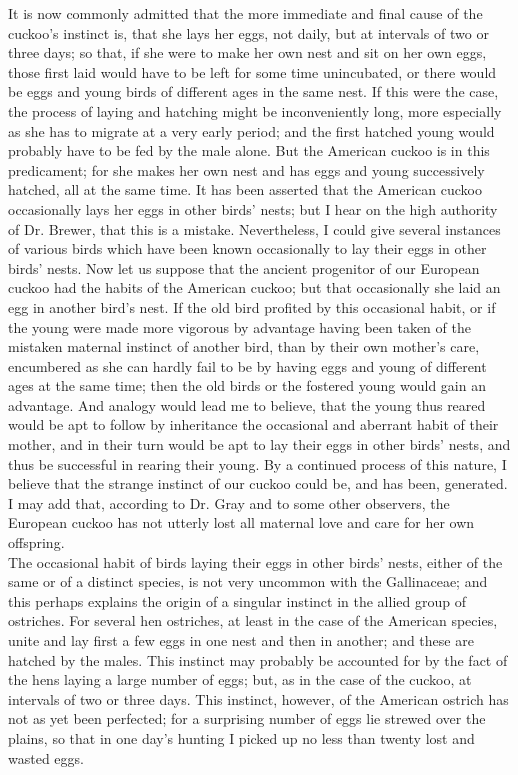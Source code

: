 \indent It is now commonly admitted that the more immediate and final cause of the cuckoo's instinct is, that she lays her eggs, not daily, but at intervals of two or three days; so that, if she were to make her own nest and sit on her own eggs, those first laid would have to be left for some time unincubated, or there would be eggs and young birds of different ages in the same nest. If this were the case, the process of laying and hatching might be inconveniently long, more especially as she has to migrate at a very early period; and the first hatched young would probably have to be fed by the male alone. But the American cuckoo is in this predicament; for she makes her own nest and has eggs and young successively hatched, all at the same time. It has been asserted that the American cuckoo occasionally lays her eggs in other birds' nests; but I hear on the high authority of Dr. Brewer, that this is a mistake. Nevertheless, I could give several instances of various birds which have been known occasionally to lay their eggs in other birds' nests.  Now let us suppose that the ancient progenitor of our European cuckoo had the habits of the American cuckoo; but that occasionally she laid an egg in another bird's nest. If the old bird profited by this occasional habit, or if the young were made more vigorous by advantage having been taken of the mistaken maternal instinct of another bird, than by their own mother's care, encumbered as she can hardly fail to be by having eggs and young of different ages at the same time; then the old birds or the fostered young would gain an advantage. And analogy would lead me to believe, that the young thus reared would be apt to follow by inheritance the occasional and aberrant habit of their mother, and in their turn would be apt to lay their eggs in other birds' nests, and thus be successful in rearing their young. By a continued process of this nature, I believe that the strange instinct of our cuckoo could be, and has been, generated. I may add that, according to Dr. Gray and to some other observers, the European cuckoo has not utterly lost all maternal love and care for her own offspring.\\
\indent The occasional habit of birds laying their eggs in other birds' nests, either of the same or of a distinct species, is not very uncommon with the Gallinaceae; and this perhaps explains the origin of a singular instinct in the allied group of ostriches. For several hen ostriches, at least in the case of the American species, unite and lay first a few eggs in one nest and then in another; and these are hatched by the males. This instinct may probably be accounted for by the fact of the hens laying a large number of eggs; but, as in the case of the cuckoo, at intervals of two or three days.  This instinct, however, of the American ostrich has not as yet been perfected; for a surprising number of eggs lie strewed over the plains, so that in one day's hunting I picked up no less than twenty lost and wasted eggs.\\
